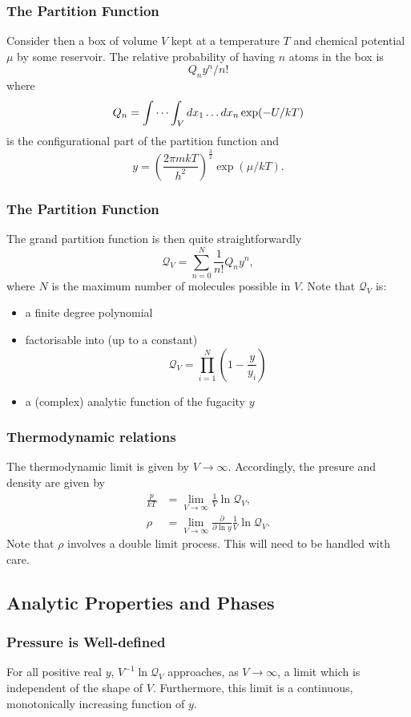 \documentclass[british]{beamer}
\begin{document}
\frame
{
  \frametitle{The Partition Function}

  Consider then a box of volume $V$ kept at a temperature $T$ and chemical potential $\mu$ by some reservoir. The relative probability of having $n$ atoms in the box is $$Q_n y^n/n!$$ where $$Q_n = \idotsint_V dx_1 \ldots dx_n \exp(-U/kT)$$ is the configurational part of the partition function and $$y = \left(\frac{2\pi m kT}{h^2}\right)^{\frac{3}{2}} \exp(\mu/kT).$$
}

\frame
{
  \frametitle{The Partition Function}
  
  The grand partition function is then quite straightforwardly $$\mathcal{Q}_V = \sum_{n=0}^N \frac{1}{n!} Q_n y^n,$$ where $N$ is the maximum number of molecules possible in $V$. Note that $\mathcal{Q}_V$ is:

  \begin{itemize}
  \item<1-> a finite degree polynomial
  \item<2-> factorisable into (up to a constant) $$\mathcal{Q}_V = \prod_{i=1}^N\left(1-\frac{y}{y_i}\right)$$ 
  \item<3-> a (complex) analytic function of the fugacity $y$
  \end{itemize}
}

\frame
{
  \frametitle{Thermodynamic relations}
  
  The thermodynamic limit is given by $V \rightarrow \infty$. Accordingly, the presure and density are given by
  \begin{align*}
  \frac{p}{kT} &= \lim_{V \rightarrow \infty}\frac{1}{V}\ln \mathcal{Q}_V, \\
  \rho &= \lim_{V \rightarrow \infty}\frac{\partial}{\partial \ln y}\frac{1}{V}\ln \mathcal{Q}_V.
  \end{align*}
  Note that $\rho$ involves a double limit process. This will need to be handled with care.
}

\subsection{Analytic Properties and Phases}
\frame
{
  \frametitle{Pressure is Well-defined}

  \begin{theorem}
  For all positive real $y$, $V^{-1} \ln \mathcal{Q}_V$ approaches, as $V\rightarrow \infty$, a limit which is independent of the shape of $V$. Furthermore, this limit is a continuous, monotonically increasing function of $y$.
  \end{theorem}
}
\end{document}
